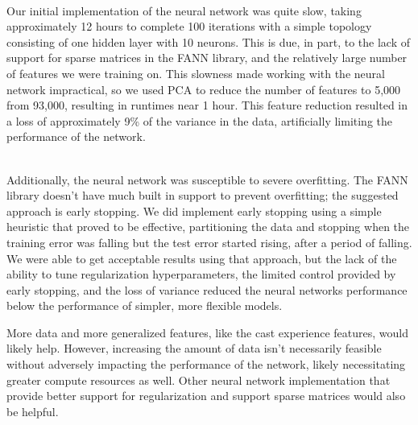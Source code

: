 \documentclass[journal]{IEEEtran}
\begin{document}
\\
\par Our initial implementation of the neural network was quite slow, taking approximately
12 hours to complete 100 iterations with a simple topology consisting of one hidden
layer with 10 neurons.  This is due, in part, to the lack of support for sparse matrices in the FANN library, and the relatively large number of features we were training on.  This slowness made working with the neural network impractical, so we used PCA to reduce the number of features to 5,000 from 93,000, resulting in runtimes near 1 hour.  This feature reduction resulted in a loss of approximately 9\% of the variance in the data, artificially limiting the performance of the network.  \\

\\
\par Additionally, the neural network was susceptible to severe overfitting.  The FANN library doesn't have much built in support to prevent overfitting; the suggested approach is early stopping.  We did implement early stopping using a simple heuristic that proved to be effective, partitioning the data and stopping when the training error was falling but the test error started rising, after a period of falling.  We were able to get acceptable results using that approach, but the lack of the ability to tune regularization hyperparameters, the limited control provided by early stopping, and the loss of variance reduced the neural networks performance below the performance of simpler, more flexible models.
\\
\par More data and more generalized features, like the cast experience features, would likely help.  However, increasing the amount of data isn't necessarily feasible without adversely impacting the performance of the network, likely necessitating greater compute resources as well.  Other neural network implementation that provide better support for regularization and support sparse matrices would also be helpful.
\end{document}
